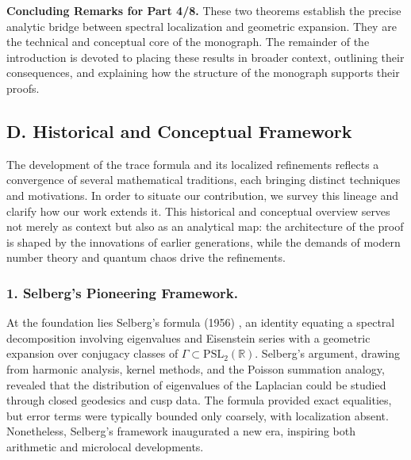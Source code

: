 \medskip

\noindent\textbf{Concluding Remarks for Part 4/8.}
These two theorems establish the precise analytic bridge between spectral localization and geometric expansion. 
They are the technical and conceptual core of the monograph. 
The remainder of the introduction is devoted to placing these results in broader context, outlining their consequences, 
and explaining how the structure of the monograph supports their proofs.


\subsection*{D. Historical and Conceptual Framework}

The development of the trace formula and its localized refinements reflects a convergence of 
several mathematical traditions, each bringing distinct techniques and motivations. 
In order to situate our contribution, we survey this lineage and clarify how our work extends it. 
This historical and conceptual overview serves not merely as context but also as an analytical map: 
the architecture of the proof is shaped by the innovations of earlier generations, 
while the demands of modern number theory and quantum chaos drive the refinements.

\subsubsection*{1. Selberg’s Pioneering Framework.}
At the foundation lies Selberg’s formula (1956) \cite{Selberg1956}, 
an identity equating a spectral decomposition involving eigenvalues and Eisenstein series with 
a geometric expansion over conjugacy classes of $\Gamma\subset\mathrm{PSL}_2(\mathbb{R})$. 
Selberg’s argument, drawing from harmonic analysis, kernel methods, and the Poisson summation analogy, 
revealed that the distribution of eigenvalues of the Laplacian could be studied through closed geodesics and cusp data. 
The formula provided exact equalities, but error terms were typically bounded only coarsely, with localization absent. 
Nonetheless, Selberg’s framework inaugurated a new era, inspiring both arithmetic and microlocal developments.

